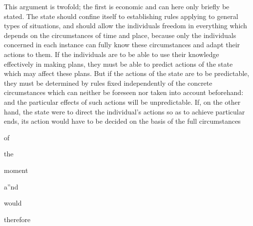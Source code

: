 \documentclass[11pt,openany]{book}
\begin{document}
\begin{center}\textasteriskcentered\hspace{0.9em}\textasteriskcentered\hspace{0.9em}\textasteriskcentered\end{center}

\begin{center}\textasteriskcentered\hspace{0.9em}\textasteriskcentered\hspace{0.9em}\textasteriskcentered\end{center}

\begin{center}\textasteriskcentered\hspace{0.9em}\textasteriskcentered\hspace{0.9em}\textasteriskcentered\end{center}

\begin{center}\textasteriskcentered\hspace{0.9em}\textasteriskcentered\hspace{0.9em}\textasteriskcentered\end{center}

This argument is twofold; the first is economic and can here only briefly be stated. The state should confine itself to establishing rules applying to general types of situations, and should allow the individuals freedom in everything which depends on the circumstances of time and place, because only the individuals concerned in each instance can fully know these circumstances and adapt their actions to them. If the individuals are to be able to use their knowledge effectively in making plans, they must be able to predict actions of the state which may affect these plans. But if the actions of the state are to be predictable, they must be determined by rules fixed independently of the concrete circumstances which can neither be foreseen nor taken into account beforehand: and the particular effects of such actions will be unpredictable. If, on the other hand, the state were to direct the individual's actions so as to achieve particular ends, its action would have to be decided on the basis of the full circumstances

of

the

moment

a''nd

would

therefore
\end{document}
